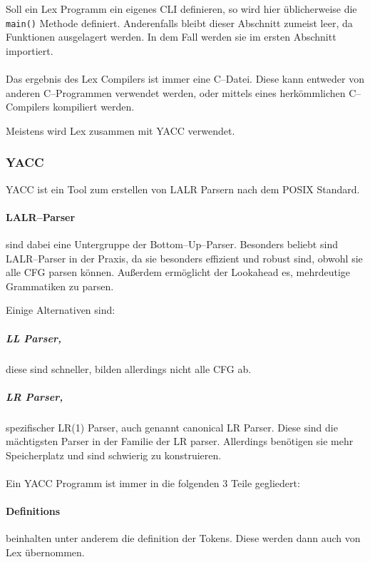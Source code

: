 Soll ein Lex Programm ein eigenes \ac{CLI} definieren, so wird hier üblicherweise die \verb|main()| Methode definiert.
Anderenfalls bleibt dieser Abschnitt zumeist leer, da Funktionen ausgelagert werden.
In dem Fall werden sie im ersten Abschnitt importiert.

\paragraph*{}
Das ergebnis des Lex Compilers ist immer eine C--Datei.
Diese kann entweder von anderen C--Programmen verwendet werden, oder mittels eines herkömmlichen C--Compilers kompiliert werden.

Meistens wird Lex zusammen mit \ac{YACC} verwendet.

\subsubsection{\acs{YACC}}
\ac{YACC} ist ein Tool zum erstellen von \ac{LALR} Parsern nach dem \ac{POSIX} Standard.

\paragraph{\acs{LALR}--Parser} sind dabei eine Untergruppe der Bottom--Up--Parser.
Besonders beliebt sind \acs{LALR}--Parser in der Praxis, da sie besonders effizient und robust sind, obwohl sie alle \ac{CFG} parsen können.
Außerdem ermöglicht der Lookahead es, mehrdeutige Grammatiken zu parsen.

Einige Alternativen sind:

\subparagraph{\ac{LL} Parser,} diese sind schneller, bilden allerdings nicht alle \ac{CFG} ab.

\subparagraph{\ac{LR} Parser,} spezifischer LR(1) Parser, auch genannt canonical \acs{LR} Parser.
Diese sind die mächtigsten Parser in der Familie der \ac{LR} parser.
Allerdings benötigen sie mehr Speicherplatz und sind schwierig zu konstruieren.

\paragraph*{}
Ein \ac{YACC} Programm ist immer in die folgenden 3 Teile gegliedert:


\paragraph{Definitions} beinhalten unter anderem die definition der Tokens.
Diese werden dann auch von Lex übernommen.

